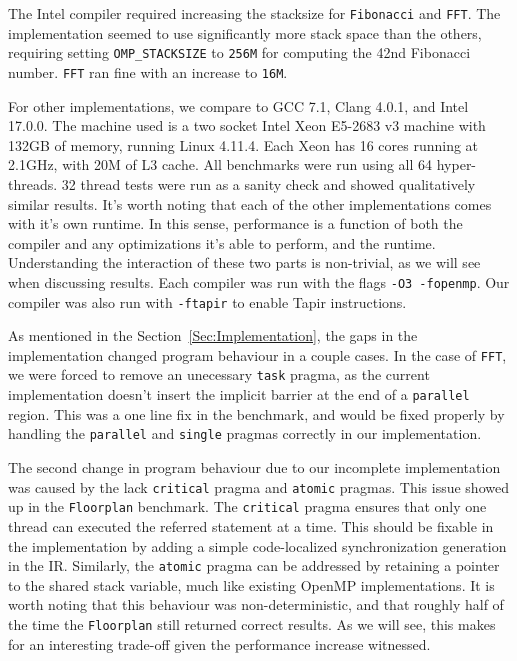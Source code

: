 \documentclass[sigconf]{acmart}
\begin{document}
The Intel compiler required increasing the stacksize for \texttt{Fibonacci} and
\texttt{FFT}. The implementation seemed to use significantly more stack space
than the others, requiring setting \texttt{OMP\_STACKSIZE} to \texttt{256M} for
computing the 42nd Fibonacci number. \texttt{FFT} ran fine with an increase to
\texttt{16M}.  

For other implementations, we compare to GCC 7.1, Clang 4.0.1, and Intel
17.0.0. The machine used is a two socket Intel Xeon E5-2683 v3 machine with
132GB of memory, running Linux 4.11.4. Each Xeon has 16 cores running at
2.1GHz, with 20M of L3 cache. All benchmarks were run using all 64
hyper-threads. 32 thread tests were run as a sanity check and showed
qualitatively similar results. It's worth noting that each of the other
implementations comes with it's own runtime. In this sense, performance is a
function of both the compiler and any optimizations it's able to perform, and
the runtime.  Understanding the interaction of these two parts is non-trivial,
as we will see when discussing results. Each compiler was run with the flags
\texttt{-O3 -fopenmp}. Our compiler was also run with \texttt{-ftapir} to
enable Tapir instructions.

As mentioned in the Section~\ref{Sec:Implementation}, the gaps in the implementation
changed program behaviour in a couple cases. In the case of \texttt{FFT}, we were
forced to remove an unecessary \texttt{task} pragma, as the current implementation
doesn't insert the implicit barrier at the end of a \texttt{parallel} region. This 
was a one line fix in the benchmark, and would be fixed properly by handling
the \texttt{parallel} and \texttt{single} pragmas correctly in our implementation. 

The second change in program behaviour due to our incomplete implementation was
caused by the lack \texttt{critical} pragma and \texttt{atomic} pragmas. This
issue showed up in the \texttt{Floorplan} benchmark. The \texttt{critical} pragma
ensures that only one thread can executed the referred statement at a time. 
This should be fixable in the implementation by adding a simple code-localized
synchronization generation in the IR. Similarly, the \texttt{atomic} pragma 
can be addressed by retaining a pointer to the shared stack variable, much like
existing OpenMP implementations. It is worth noting that this behaviour was
non-deterministic, and that roughly half of the time the \texttt{Floorplan}
still returned correct results. As we will see, this makes for an interesting
trade-off given the performance increase witnessed.
\end{document}
